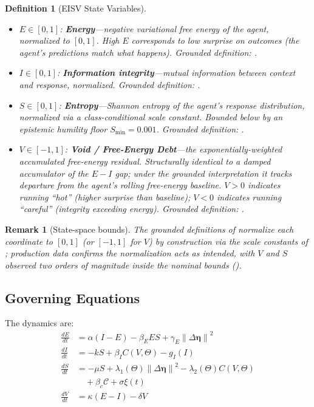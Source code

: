 \documentclass[11pt,twocolumn]{article}
\newtheorem{definition}[theorem]{Definition}
\newtheorem{remark}[theorem]{Remark}
\newcommand{\norm}[1]{\left\lVert #1 \right\rVert}
\newcommand{\deta}{\ensuremath{\Delta\bm{\eta}}}
\newcommand{\cv}{\ensuremath{C(V,\Theta)}}
\begin{document}
\begin{definition}[EISV State Variables]
\label{def:eisv}
\begin{itemize}
\item $E \in [0,1]$: \textbf{Energy}---negative variational free
  energy of the agent, normalized to $[0,1]$. High $E$ corresponds
  to low surprise on outcomes (the agent's predictions match what
  happens). \emph{Grounded definition:} .
\item $I \in [0,1]$: \textbf{Information integrity}---mutual
  information between context and response, normalized.
  \emph{Grounded definition:} .
\item $S \in [0, 1]$: \textbf{Entropy}---Shannon entropy of the
  agent's response distribution, normalized via a class-conditional
  scale constant. Bounded below by an epistemic humility floor
  $S_{\min} = 0.001$. \emph{Grounded definition:}
  .
\item $V \in [-1, 1]$: \textbf{Void / Free-Energy Debt}---the
  exponentially-weighted accumulated free-energy residual.
  Structurally identical to a damped accumulator of the $E{-}I$
  gap; under the grounded interpretation it tracks departure from
  the agent's rolling free-energy baseline. $V > 0$ indicates
  running ``hot'' (higher surprise than baseline); $V < 0$
  indicates running ``careful'' (integrity exceeding energy).
  \emph{Grounded definition:} .
\end{itemize}
\end{definition}

\begin{remark}[State-space bounds]
The grounded definitions of  normalize each
coordinate to $[0,1]$ (or $[-1,1]$ for $V$) by construction via
the scale constants of ; production
data confirms the normalization acts as intended, with $V$ and
$S$ observed two orders of magnitude inside the nominal bounds
().
\end{remark}

\subsection{Governing Equations}
\label{sec:equations}

The dynamics are:
\begin{align}
\frac{dE}{dt} &= \alpha(I - E) - \beta_E E S + \gamma_E \norm{\deta}^2
  \label{eq:dE} \\
\frac{dI}{dt} &= -kS + \beta_I \cv - g_I(I)
  \label{eq:dI} \\
\frac{dS}{dt} &= -\mu S + \lambda_1(\Theta)\norm{\deta}^2
  - \lambda_2(\Theta)\cv \nonumber \\
  &\quad + \beta_c \mathcal{C} + \sigma\xi(t)
  \label{eq:dS} \\
\frac{dV}{dt} &= \kappa(E - I) - \delta V
  \label{eq:dV}
\end{align}
\end{document}
